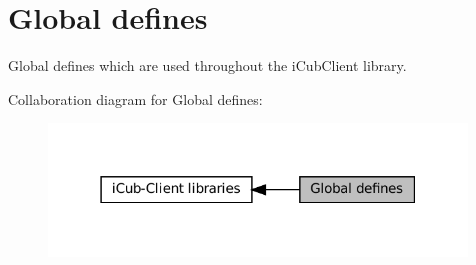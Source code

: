 \hypertarget{group__icubclient__tags}{}\section{Global defines}
\label{group__icubclient__tags}


Global defines which are used throughout the i\+Cub\+Client library.  


Collaboration diagram for Global defines\+:
\nopagebreak
\begin{figure}[H]
\begin{center}
\leavevmode
\includegraphics[width=315pt]{group__icubclient__tags}
\end{center}
\end{figure}
